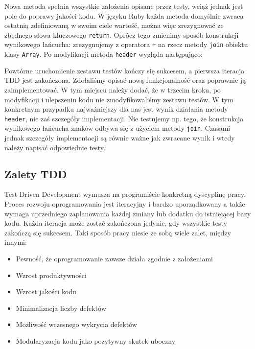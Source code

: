     Nowa metoda spełnia wszystkie założenia opisane przez testy, wciąż jednak jest pole do poprawy jakości kodu. W języku Ruby każda metoda domyślnie zwraca ostatnią zdefiniowaną w swoim ciele wartość, można więc zrezygnować ze zbędnego słowa kluczowego \texttt{return}. Oprócz tego zmienimy sposób konstrukcji wynikowego łańcucha: zrezygnujemy z operatora \texttt{+} na rzecz metody \texttt{join} obiektu klasy \texttt{Array}. Po modyfikacji metoda \texttt{header} wygląda następująco:
    
    
    
  Powtórne uruchomienie zestawu testów kończy się sukcesem, a pierwsza iteracja TDD jest zakończona. Zdołaliśmy opisać nową funkcjonalność oraz poprawnie ją zaimplementować. W tym miejscu należy dodać, że w trzecim kroku, po modyfikacji i ulepszeniu kodu nie zmodyfikowaliśmy zestawu testów. W tym konkretnym przypadku najważniejszy dla nas jest wynik działania metody \texttt{header}, nie zaś szczegóły implementacji. Nie testujemy np. tego, że konstrukcja wynikowego łańcucha znaków odbywa się z użyciem metody \texttt{join}. Czasami jednak szczegóły implementacji są równie ważne jak zwracane wynik i wtedy należy napisać odpowiednie testy.
    
  \subsection{Zalety TDD}
    Test Driven Development wymusza na programiście konkretną dyscyplinę pracy. Proces rozwoju oprogramowania jest iteracyjny i bardzo uporządkowany a także wymaga uprzedniego zaplanowania każdej zmiany lub dodatku do istniejącej bazy kodu. Każda iteracja może zostać zakończona jedynie, gdy wszystkie testy zakończą się sukcesem. Taki sposób pracy niesie ze sobą wiele zalet, między innymi:
     
    \begin{itemize}
      \item Pewność, że oprogramowanie zawsze działa zgodnie z założeniami
      \item Wzrost produktywności
      \item Wzrost jakości kodu
      \item Minimalizacja liczby defektów
      \item Możliwość wczesnego wykrycia defektów
      \item Modularyzacja kodu jako pozytywny skutek uboczny
    \end{itemize}

